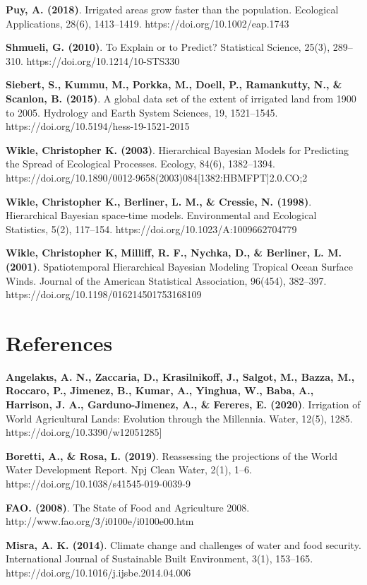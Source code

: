 \documentclass[12pt]{extarticle}
\begin{document}
\textbf{Puy, A. (2018)}. Irrigated areas grow faster than the population. Ecological Applications, 28(6), 1413–1419. https://doi.org/10.1002/eap.1743

\textbf{Shmueli, G. (2010)}. To Explain or to Predict? Statistical Science, 25(3), 289–310. https://doi.org/10.1214/10-STS330

\textbf{Siebert, S., Kummu, M., Porkka, M., Doell, P., Ramankutty, N., & Scanlon, B. (2015)}. A global data set of the extent of irrigated land from 1900 to 2005. Hydrology and Earth System Sciences, 19, 1521–1545. https://doi.org/10.5194/hess-19-1521-2015

\textbf{Wikle, Christopher K. (2003)}. Hierarchical Bayesian Models for Predicting the Spread of Ecological Processes. Ecology, 84(6), 1382–1394. https://doi.org/10.1890/0012-9658(2003)084[1382:HBMFPT]2.0.CO;2

\textbf{Wikle, Christopher K., Berliner, L. M., & Cressie, N. (1998)}. Hierarchical Bayesian space-time models. Environmental and Ecological Statistics, 5(2), 117–154. https://doi.org/10.1023/A:1009662704779

\textbf{Wikle, Christopher K, Milliff, R. F., Nychka, D., & Berliner, L. M. (2001)}. Spatiotemporal Hierarchical Bayesian Modeling Tropical Ocean Surface Winds. Journal of the American Statistical Association, 96(454), 382–397. https://doi.org/10.1198/016214501753168109

\section{References}


\textbf{Angelakιs, A. N., Zaccaria, D., Krasilnikoff, J., Salgot, M., Bazza, M., Roccaro, P., Jimenez, B., Kumar, A., Yinghua, W., Baba, A., Harrison, J. A., Garduno-Jimenez, A., & Fereres, E. (2020)}. Irrigation of World Agricultural Lands: Evolution through the Millennia. Water, 12(5), 1285. https://doi.org/10.3390/w12051285]

\textbf{Boretti, A., & Rosa, L. (2019)}. Reassessing the projections of the World Water Development Report. Npj Clean Water, 2(1), 1–6. \linebreak https://doi.org/10.1038/s41545-019-0039-9

\textbf{FAO. (2008)}. The State of Food and Agriculture 2008. 
\linebreak http://www.fao.org/3/i0100e/i0100e00.htm

\textbf{Misra, A. K. (2014)}. Climate change and challenges of water and food security. International Journal of Sustainable Built Environment, 3(1), 153–165. https://doi.org/10.1016/j.ijsbe.2014.04.006
\end{document}
